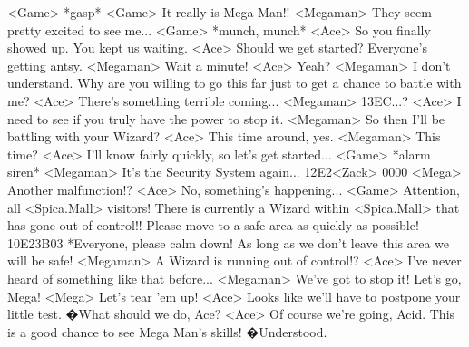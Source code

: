 <Game> *gasp* 
<Game> It really is Mega Man!! 
<Megaman> They seem pretty excited to see me... 
<Game> *munch, munch* 
<Ace> So you finally showed up. You kept us waiting. 
<Ace> Should we get started? Everyone's getting antsy. 
<Megaman> Wait a minute! 
<Ace> Yeah? 
<Megaman> I don't understand. 
Why are you willing to go this far just to get a chance to battle with me? 
<Ace> There's something terrible coming... 
<Megaman> {13}{EC}...? 
<Ace> I need to see if you truly have the power to stop it. 
<Megaman> So then I'll be battling with your Wizard? 
<Ace> This time around, yes. 
<Megaman> This time? 
<Ace> I'll know fairly quickly, so let's get started... 
<Game> *alarm siren* 
<Megaman> It's the Security System again... 
{12}{E2}<Zack> {00}{00} 
<Mega> Another malfunction!? 
<Ace> No, something's happening... 
<Game> Attention, all <Spica.Mall> visitors! 
There is currently a Wizard within <Spica.Mall> that has gone out of control!! 
Please move to a safe area as quickly as possible! 
{10}{E2}{3B}{03} 
*Everyone, please calm down! 
As long as we don't leave this area we will be safe! 
<Megaman> A Wizard is running out of control!? 
<Ace> I've never heard of something like that before... 
<Megaman> We've got to stop it! Let's go, Mega! 
<Mega> Let's tear 'em up! 
<Ace> Looks like we'll have to postpone your little test. 
�What should we do, Ace? 
<Ace> Of course we're going, Acid. 
This is a good chance to see Mega Man's skills! 
�Understood. 
